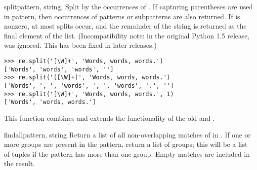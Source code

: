 \begin{funcdesc}{split}{pattern, string, }
  Split  by the occurrences of .  If
  capturing parentheses are used in pattern, then occurrences of
  patterns or subpatterns are also returned.
  If  is nonzero, at most  splits
  occur, and the remainder of the string is returned as the final
  element of the list.  (Incompatibility note: in the original Python
  1.5 release,  was ignored.  This has been fixed in
  later releases.)
%
\begin{verbatim}
>>> re.split('[\W]+', 'Words, words, words.')
['Words', 'words', 'words', '']
>>> re.split('([\W]+)', 'Words, words, words.')
['Words', ', ', 'words', ', ', 'words', '.', '']
>>> re.split('[\W]+', 'Words, words, words.', 1)
['Words', 'words, words.']
\end{verbatim}
%
  This function combines and extends the functionality of
  the old  and .
\end{funcdesc}

\begin{funcdesc}{findall}{pattern, string}
Return a list of all non-overlapping matches of  in
.  If one or more groups are present in the pattern,
return a list of groups; this will be a list of tuples if the pattern
has more than one group.  Empty matches are included in the result.
\end{funcdesc}

